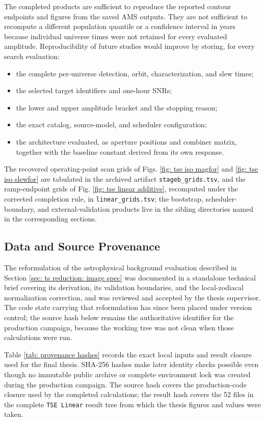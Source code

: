 \documentclass[12pt,a4paper]{article}
\numberwithin{equation}{section}
\numberwithin{figure}{section}
\numberwithin{table}{section}
\begin{document}
The completed products are sufficient to reproduce the reported contour endpoints and figures from the saved AMS outputs. They are not sufficient to recompute a different population quantile or a confidence interval in years because individual universe times were not retained for every evaluated amplitude. Reproducibility of future studies would improve by storing, for every search evaluation:
\begin{itemize}
    \item the complete per-universe detection, orbit, characterization, and slew times;
    \item the selected target identifiers and one-hour SNRs;
    \item the lower and upper amplitude bracket and the stopping reason;
    \item the exact catalog, source-model, and scheduler configuration;
    \item the architecture evaluated, as aperture positions and combiner matrix, together with the baseline constant derived from its own response.
\end{itemize}

The recovered operating-point scan grids of Figs. \ref{fig: tse iso magfor} and \ref{fig: tse iso slewfor} are tabulated in the archived artifact \texttt{stageb\_grids.tsv}, and the ramp-endpoint grids of Fig. \ref{fig: tse linear additive}, recomputed under the corrected completion rule, in \texttt{linear\_grids.tsv}; the bootstrap, scheduler-boundary, and external-validation products live in the sibling directories named in the corresponding sections.

\subsection{Data and Source Provenance} \label{app: provenance}
The reformulation of the astrophysical background evaluation described in Section \ref{sec: ts reduction: image spec} was documented in a standalone technical brief covering its derivation, its validation boundaries, and the local-zodiacal normalization correction, and was reviewed and accepted by the thesis supervisor. The code state carrying that reformulation has since been placed under version control; the source hash below remains the authoritative identifier for the production campaign, because the working tree was not clean when those calculations were run.

Table \ref{tab: provenance hashes} records the exact local inputs and result closure used for the final thesis. SHA-256 hashes make later identity checks possible even though no immutable public archive or complete environment lock was created during the production campaign. The source hash covers the production-code closure used by the completed calculations; the result hash covers the 52 files in the complete \texttt{TSE Linear} result tree from which the thesis figures and values were taken.
\end{document}
